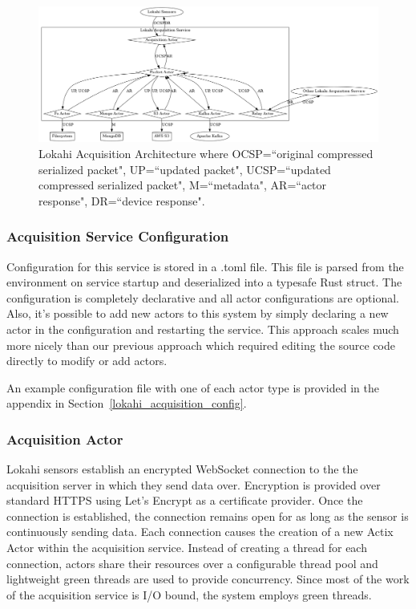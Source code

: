 \begin{figure}
	\centering
	\includegraphics[width=\linewidth]{figures/lokahi_acquisition.png}
	\caption{Lokahi Acquisition Architecture where OCSP=``original compressed serialized packet", UP=``updated packet", UCSP=``updated compressed serialized packet", M=``metadata", AR=``actor response", DR=``device response".}
	\label{fig:LokahiAcquisition}
\end{figure}

\subsubsection{Acquisition Service Configuration}

Configuration for this service is stored in a .toml file. This file is parsed from the environment on service startup and deserialized into a typesafe Rust struct. The configuration is completely declarative and all actor configurations are optional. Also, it's possible to add new actors to this system by simply declaring a new actor in the configuration and restarting the service. This approach scales much more nicely than our previous approach which required editing the source code directly to modify or add actors.

An example configuration file with one of each actor type is provided in the appendix in Section~\ref{lokahi_acquisition_config}.

\subsubsection{Acquisition Actor}
Lokahi sensors establish an encrypted WebSocket connection to the the acquisition server in which they send data over. Encryption is provided over standard HTTPS using Let's Encrypt as a certificate provider. Once the connection is established, the connection remains open for as long as the sensor is continuously sending data. Each connection causes the creation of a new Actix Actor within the acquisition service. Instead of creating a thread for each connection, actors share their resources over a configurable thread pool and lightweight green threads are used to provide concurrency. Since most of the work of the acquisition service is I/O bound, the system employs green threads.


